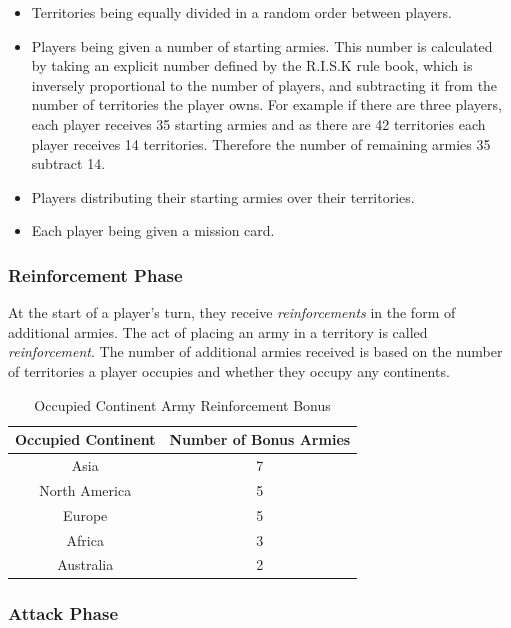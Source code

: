 \documentclass[parskip]{cs4rep}
\begin{document}
\begin{itemize}
\item
Territories being equally divided in a random order between players.
\item
Players being given a number of starting armies. This number is calculated by taking an explicit number defined by the R.I.S.K rule book, which is inversely proportional to the number of players, and subtracting it from the number of territories the player owns. For example if there are three players, each player receives 35 starting armies and as there are 42 territories each player receives 14 territories. Therefore the number of remaining armies 35 subtract 14.
\item
Players distributing their starting armies over their territories.
\item
Each player being given a mission card.
\end{itemize}

\subsubsection{Reinforcement Phase}

At the start of a player's turn, they receive \textit{reinforcements} in the form of additional armies. The act of placing an army in a territory is called \textit{reinforcement}.  The number of additional armies received is based on the number of territories a player occupies and whether they occupy any continents.

\begin{table}[ht]
\centering
\begin{tabular}{|c|c|}
\hline 
\textbf{Occupied Continent} & \textbf{Number of Bonus Armies} \\ 
\hline 
Asia & 7 \\ 
\hline 
North America & 5 \\ 
\hline 
Europe & 5 \\ 
\hline 
Africa & 3 \\
\hline
Australia & 2 \\
\hline
\end{tabular}{}
\caption{Occupied Continent Army Reinforcement Bonus}
\label{table:continent-bonus}
\end{table}

\subsubsection{Attack Phase}
\end{document}
